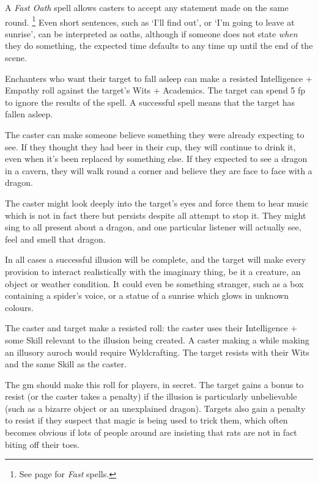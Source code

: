 \begin{multicols}{2}
A \textit{Fast Oath} spell allows casters to accept any statement made on the same round.%
\footnote{See page \pageref{fast} for \textit{Fast} spells.}
Even short sentences, such as `I'll find out', or `I'm going to leave at sunrise', can be interpreted as oaths, although if someone does not state \textit{when} they do something, the expected time defaults to any time up until the end of the scene.

\spelllevel


Enchanters who want their target to fall asleep can make a resisted Intelligence + Empathy roll against the target's Wits + Academics.
The target can spend 5 \gls{fp} to ignore the results of the spell. A successful spell means that the target has fallen asleep.


The caster can make someone believe something they were already expecting to see.
If they thought they had beer in their cup, they will continue to drink it, even when it's been replaced by something else.
If they expected to see a dragon in a cavern, they will walk round a corner and believe they are face to face with a dragon.

The caster might look deeply into the target's eyes and force them to hear music which is not in fact there but persists despite all attempt to stop it. They might sing to all present about a dragon, and one particular listener will actually see, feel and smell that dragon.

In all cases a successful illusion will be complete, and the target will make every provision to interact realistically with the imaginary thing, be it a creature, an object or weather condition. It could even be something stranger, such as a box containing a spider's voice, or a statue of a sunrise which glows in unknown colours.

The caster and target make a resisted roll: the caster uses their Intelligence + some Skill relevant to the illusion being created.
A caster making a 
\iftoggle{aif}%
{dragon might use Xenomology,}%
{trebuchet might use Crafts,}
while making an illusory auroch would require Wyldcrafting.
The target resists with their Wits and the same Skill as the caster.

The \gls{gm} should make this roll for players, in secret. The target gains a bonus to resist (or the caster takes a penalty) if the illusion is particularly unbelievable (such as a bizarre object or an unexplained dragon). Targets also gain a penalty to resist if they suspect that magic is being used to trick them, which often becomes obvious if lots of people around are insisting that rats are not in fact biting off their toes.


\end{multicols}
